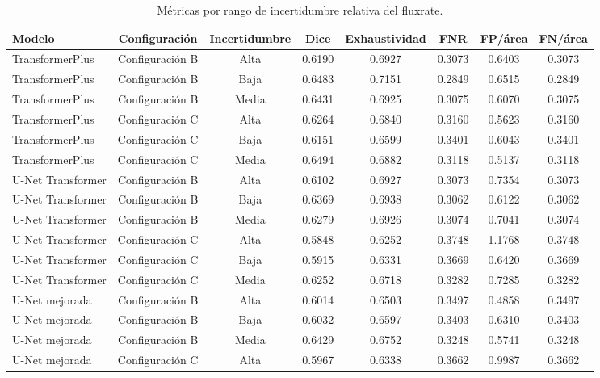 \begin{table}[H]
    \centering
    \small
    \caption{Métricas por rango de incertidumbre relativa del fluxrate.}
    \label{tab:metricas_por_incertidumbre_fluxrate}
    \begin{tabular}{lccccccc}
        \toprule
        Modelo & Configuración & Incertidumbre & Dice & Exhaustividad & FNR & FP/área & FN/área \\
        \midrule
        TransformerPlus & Configuración B & Alta & 0.6190 & 0.6927 & 0.3073 & 0.6403 & 0.3073 \\
        TransformerPlus & Configuración B & Baja & 0.6483 & 0.7151 & 0.2849 & 0.6515 & 0.2849 \\
        TransformerPlus & Configuración B & Media & 0.6431 & 0.6925 & 0.3075 & 0.6070 & 0.3075 \\
        TransformerPlus & Configuración C & Alta & 0.6264 & 0.6840 & 0.3160 & 0.5623 & 0.3160 \\
        TransformerPlus & Configuración C & Baja & 0.6151 & 0.6599 & 0.3401 & 0.6043 & 0.3401 \\
        TransformerPlus & Configuración C & Media & 0.6494 & 0.6882 & 0.3118 & 0.5137 & 0.3118 \\
        U-Net Transformer & Configuración B & Alta & 0.6102 & 0.6927 & 0.3073 & 0.7354 & 0.3073 \\
        U-Net Transformer & Configuración B & Baja & 0.6369 & 0.6938 & 0.3062 & 0.6122 & 0.3062 \\
        U-Net Transformer & Configuración B & Media & 0.6279 & 0.6926 & 0.3074 & 0.7041 & 0.3074 \\
        U-Net Transformer & Configuración C & Alta & 0.5848 & 0.6252 & 0.3748 & 1.1768 & 0.3748 \\
        U-Net Transformer & Configuración C & Baja & 0.5915 & 0.6331 & 0.3669 & 0.6420 & 0.3669 \\
        U-Net Transformer & Configuración C & Media & 0.6252 & 0.6718 & 0.3282 & 0.7285 & 0.3282 \\
        U-Net mejorada & Configuración B & Alta & 0.6014 & 0.6503 & 0.3497 & 0.4858 & 0.3497 \\
        U-Net mejorada & Configuración B & Baja & 0.6032 & 0.6597 & 0.3403 & 0.6310 & 0.3403 \\
        U-Net mejorada & Configuración B & Media & 0.6429 & 0.6752 & 0.3248 & 0.5741 & 0.3248 \\
        U-Net mejorada & Configuración C & Alta & 0.5967 & 0.6338 & 0.3662 & 0.9987 & 0.3662 \\

\end{tabular}
\end{table}

